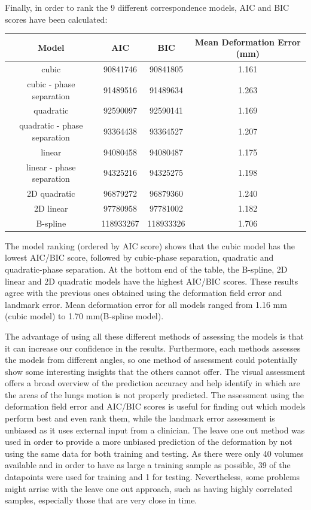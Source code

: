 \documentclass[11pt,a4paper,oneside]{report}
\begin{document}
Finally, in order to rank the 9 different correspondence models, AIC and BIC scores have been calculated:
\begin{center}
\begin{tabular}{c | c | c | c}
  Model & AIC & BIC & Mean Deformation Error (mm)\\
  \hline
cubic & 90841746 & 90841805 & 1.161\\
cubic - phase separation & 91489516 & 91489634 & 1.263\\
quadratic & 92590097 & 92590141 & 1.169\\
quadratic - phase separation & 93364438 & 93364527 & 1.207\\
linear & 94080458 & 94080487 & 1.175\\
linear - phase separation & 94325216 & 94325275 & 1.198\\
2D quadratic & 96879272 & 96879360 & 1.240\\
2D linear & 97780958 & 97781002 & 1.182\\
B-spline & 118933267 & 118933326 & 1.706\\
\end{tabular}
\end{center}

The model ranking (ordered by AIC score) shows that the cubic model has the lowest AIC/BIC score, followed by cubic-phase separation, quadratic and quadratic-phase separation. At the bottom end of the table, the B-spline, 2D linear and 2D quadratic models have the highest AIC/BIC scores. These results agree with the previous ones obtained using the deformation field error and landmark error. Mean deformation error for all models ranged from 1.16 mm (cubic model) to 1.70 mm(B-spline model).

The advantage of using all these different methods of assessing the models is that it can increase our confidence in the results. Furthermore, each methods assesses the models from different angles, so one method of assessment could potentially show some interesting insights that the others cannot offer. The visual assessment offers a broad overview of the prediction accuracy and help identify in which are the areas of the lungs motion is not properly predicted. The assessment using the deformation field error and AIC/BIC scores is useful for finding out which models perform best and even rank them, while the landmark error assessment is unbiased as it uses external input from a clinician. The leave one out method was used in order to provide a more unbiased prediction of the deformation by not using the same data for both training and testing. As there were only 40 volumes available and in order to have as large a training sample as possible, 39 of the datapoints were used for training and 1 for testing. Nevertheless, some problems might arrise with the leave one out approach, such as having highly correlated samples, especially those that are very close in time.
\end{document}
